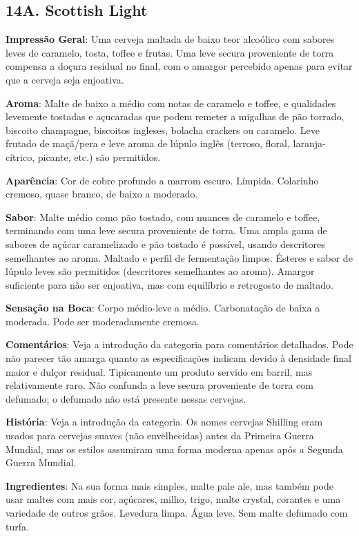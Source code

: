 \subsection*{14A. Scottish Light}
\textbf{Impressão Geral}: Uma cerveja maltada de baixo teor alcoólico com sabores leves de caramelo, tosta, toffee e frutas. Uma leve secura proveniente de torra compensa a doçura residual no final, com o amargor percebido apenas para evitar que a cerveja seja enjoativa.

\textbf{Aroma}: Malte de baixo a médio com notas de caramelo e toffee, e qualidades levemente tostadas e açucaradas que podem remeter a migalhas de pão torrado, biscoito champagne, biscoitos ingleses, bolacha crackers ou caramelo. Leve frutado de maçã/pera e leve aroma de lúpulo inglês (terroso, floral, laranja-cítrico, picante, etc.) são permitidos.

\textbf{Aparência}: Cor de cobre profundo a marrom escuro. Límpida. Colarinho cremoso, quase branco, de baixo a moderado.

\textbf{Sabor}: Malte médio como pão tostado, com nuances de caramelo e toffee, terminando com uma leve secura proveniente de torra. Uma ampla gama de sabores de açúcar caramelizado e pão tostado é possível, usando descritores semelhantes ao aroma. Maltado e perfil de fermentação limpos. Ésteres e sabor de lúpulo leves são permitidos (descritores semelhantes ao aroma). Amargor suficiente para não ser enjoativa, mas com equilíbrio e retrogosto de maltado.

\textbf{Sensação na Boca}: Corpo médio-leve a médio. Carbonatação de baixa a moderada. Pode ser moderadamente cremosa.

\textbf{Comentários}: Veja a introdução da categoria para comentários detalhados. Pode não parecer tão amarga quanto as especificações indicam devido à densidade final maior e dulçor residual. Tipicamente um produto servido em barril, mas relativamente raro. Não confunda  a leve secura proveniente de torra com defumado; o defumado não está presente nessas cervejas.

\textbf{História}: Veja a introdução da categoria. Os nomes cervejas Shilling eram usados para cervejas suaves (não envelhecidas) antes da Primeira Guerra Mundial, mas os estilos assumiram uma forma moderna apenas após a Segunda Guerra Mundial.

\textbf{Ingredientes}: Na sua forma mais simples, malte pale ale, mas também pode usar maltes com mais cor, açúcares, milho, trigo, malte crystal, corantes e uma variedade de outros grãos. Levedura limpa. Água leve. Sem malte defumado com turfa.

